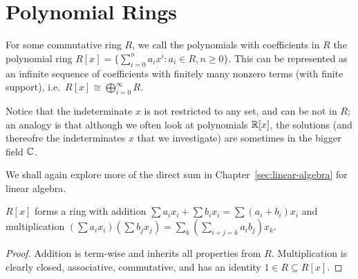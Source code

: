 \section{Polynomial Rings}

\begin{definition}
    For some commutative ring \(R\),
    we call the polynomials with coefficients in \(R\)
    the polynomial ring \(R[x] = \{\sum_{i=0}^n a_i x^i : a_i \in R, n \geq 0\}\).
    This can be represented as an infinite sequence of coefficients
    with finitely many nonzero terms (with finite support),
    i.e.\ \(R[x] \cong \bigoplus_{i=0}^\infty R\).
\end{definition}
\begin{remark}
    Notice that the indeterminate \(x\) is not restricted to any set,
    and can be not in \(R\);
    an analogy is that although we often look at polynomials \(\mathbb{R}[x]\),
    the solutions (and thereofre the indeterminates \(x\) that we investigate)
    are sometimes in the bigger field \(\mathbb{C}\).
\end{remark}
\begin{remark}
    We shall again explore more of the direct sum
    in Chapter~\ref{sec:linear-algebra} for linear algebra.
\end{remark}
\begin{proposition}
    \(R[x]\) forms a ring with addition
    \(\sum a_i x_i + \sum b_i x_i = \sum (a_i+b_i) x_i\)
    and multiplication
    \((\sum a_i x_i)(\sum b_j x_j) = \sum_k (\sum_{i+j=k} a_i b_j) x_k\).
\end{proposition}
\begin{proof}
    Addition is term-wise and inherits all properties from \(R\).
    Multiplication is clearly closed, associative, commutative,
    and has an identity \(1 \in R \subseteq R[x]\).
\end{proof}

